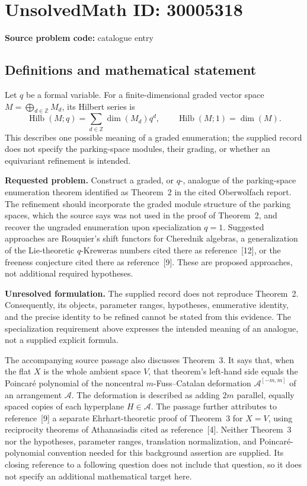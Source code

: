 \documentclass[11pt]{article}
\newcommand{\Z}{\mathbb{Z}}
\begin{document}
\section*{UnsolvedMath ID: 30005318}
\textbf{Source problem code:} catalogue entry
\subsection{Definitions and mathematical statement}
Let \(q\) be a formal variable. For a finite-dimensional graded vector space \(M=\bigoplus_{d\in\Z}M_d\), its Hilbert series is
\[
\operatorname{Hilb}(M;q)=\sum_{d\in\Z}\dim(M_d)q^d,
\qquad
\operatorname{Hilb}(M;1)=\dim(M).
\]
This describes one possible meaning of a graded enumeration; the supplied record does not specify the parking-space modules, their grading, or whether an equivariant refinement is intended.

\textbf{Requested problem.} Construct a graded, or \(q\)-, analogue of the parking-space enumeration theorem identified as Theorem~2 in the cited Oberwolfach report. The refinement should incorporate the graded module structure of the parking spaces, which the source says was not used in the proof of Theorem~2, and recover the ungraded enumeration upon specialization \(q=1\). Suggested approaches are Rouquier's shift functors for Cherednik algebras, a generalization of the Lie-theoretic \(q\)-Kreweras numbers cited there as reference~[12], or the freeness conjecture cited there as reference~[9]. These are proposed approaches, not additional required hypotheses.

\textbf{Unresolved formulation.} The supplied record does not reproduce Theorem~2. Consequently, its objects, parameter ranges, hypotheses, enumerative identity, and the precise identity to be refined cannot be stated from this evidence. The specialization requirement above expresses the intended meaning of an analogue, not a supplied explicit formula.

The accompanying source passage also discusses Theorem~3. It says that, when the flat \(X\) is the whole ambient space \(V\), that theorem's left-hand side equals the Poincar\'e polynomial of the noncentral \(m\)-Fuss--Catalan deformation \(\mathcal A^{[-m,m]}\) of an arrangement \(\mathcal A\). The deformation is described as adding \(2m\) parallel, equally spaced copies of each hyperplane \(H\in\mathcal A\). The passage further attributes to reference~[9] a separate Ehrhart-theoretic proof of Theorem~3 for \(X=V\), using reciprocity theorems of Athanasiadis cited as reference~[4]. Neither Theorem~3 nor the hypotheses, parameter ranges, translation normalization, and Poincar\'e-polynomial convention needed for this background assertion are supplied. Its closing reference to a following question does not include that question, so it does not specify an additional mathematical target here.
\end{document}
